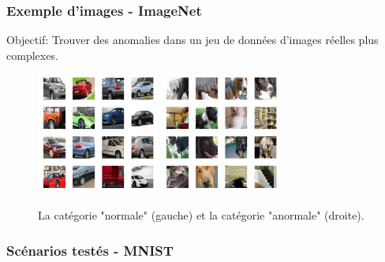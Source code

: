 \documentclass{beamer}
\begin{document}
	\begin{frame}
		\frametitle{Exemple d'images - ImageNet}
		Objectif: Trouver des anomalies dans un jeu de données d'images réelles plus complexes.
		
		\begin{figure}
			\includegraphics[width=4cm]{../rapports/images/imagenet-inliers}
			\includegraphics[width=4cm]{../rapports/images/imagenet-outliers}
			\caption{La catégorie "normale" (gauche) et la catégorie "anormale" (droite).}
		\end{figure}
		
	\end{frame}


	\begin{frame}
		\frametitle{Scénarios testés - MNIST}
		
		
	\end{frame}
\end{document}
